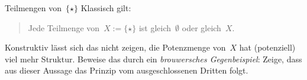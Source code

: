 \documentclass{pizzablatt}
\begin{document}
\begin{aufgabe}{Teilmengen von~$\{\star\}$}
Klassisch gilt:
\begin{quote}
  Jede Teilmenge von~$X := \{ \star \}$ ist gleich~$\emptyset$ oder gleich~$X$.
\end{quote}
Konstruktiv lässt sich das nicht zeigen, die Potenzmenge von~$X$ hat
(potenziell) viel mehr Struktur. Beweise das durch ein \emph{brouwersches
Gegenbeispiel}: Zeige, dass aus dieser Aussage das
Prinzip vom ausgeschlossenen Dritten folgt.
\end{aufgabe}
\end{document}
